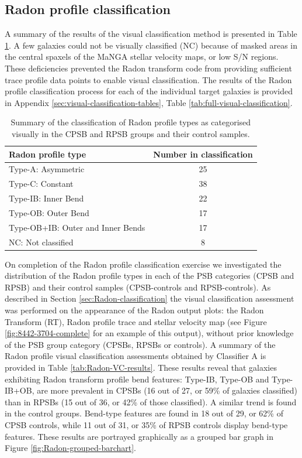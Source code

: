 \subsection{Radon profile classification}
\label{sec:Radon-profile-classification}

A summary of the results of the visual classification method is presented in Table \ref{tab:Radon-class-summary}.  A few galaxies could not be visually classified (NC) because of masked areas in the central spaxels of the MaNGA stellar velocity maps, or low S/N regions. These deficiencies prevented the Radon transform code from providing sufficient trace profile data points to enable visual classification. The results of the Radon profile classification process for each of the individual target galaxies is provided in Appendix \ref{sec:visual-classification-tables}, Table \ref{tab:full-visual-classification}. 

\begin{table}
    \centering
    \caption[Summary of Radon profile type visual classifications]{Summary of the classification of Radon profile types as categorised visually in the CPSB and RPSB groups and their control samples.}
    \label{tab:Radon-class-summary}
    \begin{tabular}{lc}
    \hline
    Radon profile type & Number in classification \\
    \hline
    Type-A: Asymmetric & 25 \\
    Type-C: Constant & 38 \\
    Type-IB: Inner Bend & 22 \\
    Type-OB: Outer Bend & 17 \\
    Type-OB+IB: Outer and Inner Bends & 17 \\
    NC: Not classified & 8 \\
    \hline
    \end{tabular}
\end{table}

On completion of the Radon profile classification exercise we investigated the distribution of the Radon profile types in each of the PSB categories (CPSB and RPSB) and their control samples (CPSB-controls and RPSB-controls). As described in Section \ref{sec:Radon-classification} the visual classification assessment was performed on the appearance of the Radon output plots: the Radon Transform (RT), Radon profile trace and stellar velocity map (see Figure \ref{fig:8442-3704-complete} for an example of this output), without prior knowledge of the PSB group category (CPSBs, RPSBs or controls). A summary of the Radon profile visual classification assessments obtained by Classifier A is provided in Table \ref{tab:Radon-VC-results}. These results reveal that galaxies exhibiting Radon transform profile bend features: Type-IB, Type-OB and Type-IB+OB, are more prevalent in CPSBs (16 out of 27, or 59\% of galaxies classified) than in RPSBs (15 out of 36, or 42\% of those classified). A similar trend is found in the control groups. Bend-type features are found in 18 out of 29, or 62\% of CPSB controls, while 11 out of 31, or 35\% of RPSB controls display bend-type features. These results are portrayed graphically as a grouped bar graph in Figure \ref{fig:Radon-grouped-barchart}.


